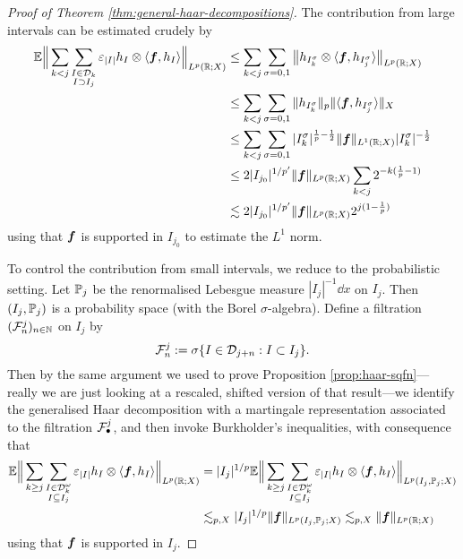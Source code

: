 \begin{proof}[Proof of Theorem \ref{thm:general-haar-decompositions}]
  The contribution from large intervals can be estimated crudely by
  \begin{equation*}
    \begin{aligned}
      \E \Big\| \sum_{k < j} \sum_{\substack{I \in \mc{D}_{k} \\ I \supset I_{j}}} \varepsilon_{|I|} h_{I} \otimes \langle \mb{f}, h_{I} \rangle \Big\|_{L^p(\R;X)}
      &\leq \sum_{k < j} \sum_{\sigma = 0,1} \big\| h_{I^{\sigma}_{k}} \otimes \langle \mb{f}, h_{I^{\sigma}_{j}} \rangle \big\|_{L^p(\R;X)} \\
      &\leq \sum_{k < j} \sum_{\sigma = 0,1} \|h_{I^{\sigma}_{k}}\|_{p} \| \langle \mb{f}, h_{I^{\sigma}_{j}} \rangle \|_{X} \\
      &\leq  \sum_{k < j} \sum_{\sigma = 0,1} |I_{k}^\sigma|^{\frac{1}{p}-\frac{1}{2}} \|\mb{f}\|_{L^1(\R;X)} |I_{k}^{\sigma}|^{-\frac{1}{2}} \\
      &\leq 2|I_{j_{0}}|^{1/p'} \|\mb{f}\|_{L^p(\R;X)} \sum_{k < j} 2^{-k(\frac{1}{p} - 1)} \\
      &\lesssim 2 |I_{j_{0}}|^{1/p'} \|\mb{f}\|_{L^p(\R;X)} 2^{j(1 - \frac{1}{p})}
    \end{aligned}
  \end{equation*}
  using that $\mb{f}$ is supported in $I_{j_{0}}$ to estimate the $L^1$ norm.

  To control the contribution from small intervals, we reduce to the probabilistic setting.
  Let $\P_{j}$ be the renormalised Lebesgue measure $|I_{j}|^{-1} \dd x$ on $I_{j}$.
  Then $(I_{j},\P_{j})$ is a probability space (with the Borel $\sigma$-algebra).
  Define a filtration $(\mc{F}_{n}^{j})_{n \in \N}$ on $I_{j}$ by
  \begin{equation*}
    \mc{F}_{n}^{j} := \sigma\{I \in \mc{D}_{j+n} : I \subset I_{j}\}.
  \end{equation*} 
  Then by the same argument we used to prove Proposition \ref{prop:haar-sqfn}---really we are just looking at a rescaled, shifted version of that result---we identify the generalised Haar decomposition with a martingale representation associated to the filtration $\mc{F}^{j}_{\bullet}$, and then invoke Burkholder's inequalities, with consequence that
  \begin{equation*}
    \begin{aligned}
      \E \Big\| \sum_{k \geq j} \sum_{\substack{I \in \mc{D}_{k}^{\omega} \\ I \subseteq I_{j}}} \varepsilon_{|I|} h_{I} \otimes \langle \mb{f}, h_{I} \rangle \Big\|_{L^p(\R;X)}
      &=  |I_{j}|^{1/p} \E \Big\| \sum_{k \geq j} \sum_{\substack{I \in \mc{D}_{k}^{\omega} \\ I \subseteq I_{j}}} \varepsilon_{|I|} h_{I} \otimes \langle \mb{f}, h_{I} \rangle \Big\|_{L^p(I_{j}, \P_{j};X)} \\
      &\lesssim_{p,X} |I_{j}|^{1/p} \|\mb{f}\|_{L^p(I_{j},\P_{j};X)} 
      \lesssim_{p,X} \|\mb{f}\|_{L^p(\R;X)}
    \end{aligned}
  \end{equation*}
  using that $\mb{f}$ is supported in $I_{j}$.
  

\end{proof}
